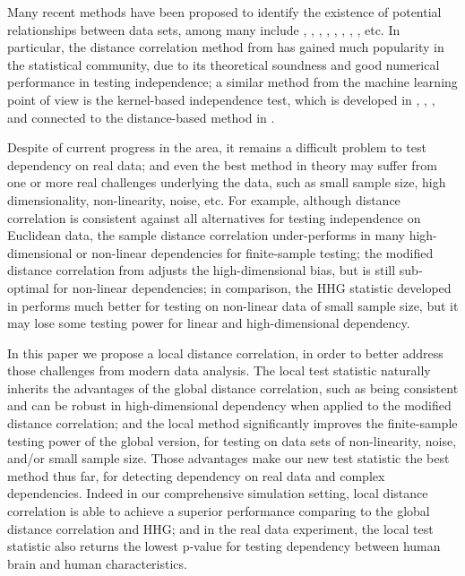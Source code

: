\documentclass[12pt]{article}
\begin{document}
Many recent methods have been proposed to identify the existence of potential relationships between data sets, among many include \cite{TaskinenOjaRandles2005}, \cite{GrettonEtAl2005}, \cite{SzekelyRizzoBakirov2007}, \cite{GrettonGyorfi2010}, \cite{Reshef2011}, \cite{HellerGorfine2013}, \cite{Reimherr2013}, \cite{SzekelyRizzo2013a}, etc. In particular, the distance correlation method from \cite{SzekelyRizzoBakirov2007} has gained much popularity in the statistical community, due to its theoretical soundness and good numerical performance in testing independence; a similar method from the machine learning point of view is the kernel-based independence test, which is developed in \cite{GrettonEtAl2005}, \cite{GrettonGyorfi2010}, \cite{GrettonEtAl2012}, and connected to the distance-based method in \cite{SejdinovicEtAl2013}.

Despite of current progress in the area, it remains a difficult problem to test dependency on real data; and even the best method in theory may suffer from one or more real challenges underlying the data, such as small sample size, high dimensionality, non-linearity, noise, etc. For example, although distance correlation is consistent against all alternatives for testing independence on Euclidean data, the sample distance correlation under-performs in many high-dimensional or non-linear dependencies for finite-sample testing; the modified distance correlation from \cite{SzekelyRizzo2013a} adjusts the high-dimensional bias, but is still sub-optimal for non-linear dependencies; in comparison, the HHG statistic developed in \cite{HellerGorfine2013} performs much better for testing on non-linear data of small sample size, but it may lose some testing power for linear and high-dimensional dependency.

In this paper we propose a local distance correlation, in order to better address those challenges from modern data analysis. The local test statistic naturally inherits the advantages of the global distance correlation, such as being consistent and can be robust in high-dimensional dependency when applied to the modified distance correlation; and the local method significantly improves the finite-sample testing power of the global version, for testing on data sets of non-linearity, noise, and/or small sample size. Those advantages make our new test statistic the best method thus far, for detecting dependency on real data and complex dependencies. Indeed in our comprehensive simulation setting, local distance correlation is able to achieve a superior performance comparing to the global distance correlation and HHG; and in the real data experiment, the local test statistic also returns the lowest p-value for testing dependency between human brain and human characteristics.
\end{document}

